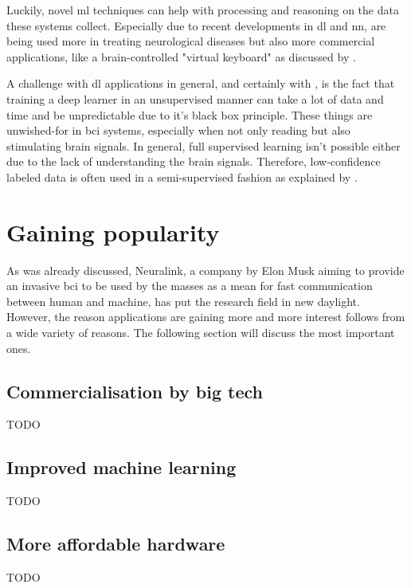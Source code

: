 Luckily, novel \gls{ml} techniques can help with processing and reasoning on the data these systems collect.
Especially due to recent developments in \gls{dl} and \gls{nn},  are being used more in treating neurological diseases \citep{bci_diseases} but also more commercial applications, like a brain-controlled "virtual keyboard" as discussed by \citet{bci_keyboard}.

A challenge with \acrshort{dl} applications in general, and certainly with , is the fact that training a deep learner in an unsupervised manner can take a lot of data and time and be unpredictable due to it's black box principle.
These things are unwished-for in \acrshort{bci} systems, especially when not only reading but also stimulating brain signals.
In general, full supervised learning isn't possible either due to the lack of understanding the brain signals.
Therefore, low-confidence labeled data is often used in a semi-supervised fashion as explained by \citet{deep_learn_low_label}.

\section{Gaining popularity}
\label{sec:introduction_gaining_popularity}

As was already discussed, Neuralink, a company by Elon Musk aiming to provide an invasive \acrshort{bci} to be used by the masses as a mean for fast communication between human and machine, has put the research field in new daylight.
However, the reason  applications are gaining more and more interest follows from a wide variety of reasons.
The following section will discuss the most important ones.

\subsection{Commercialisation by big tech}
\label{subsec:introduction_gaining_popularity_big_tech}
TODO

\subsection{Improved machine learning}
\label{subsec:introduction_gaining_popularity_improved_ml}
TODO

\subsection{More affordable hardware}
\label{subsec:introduction_gaining_popularity_affordability}
TODO

